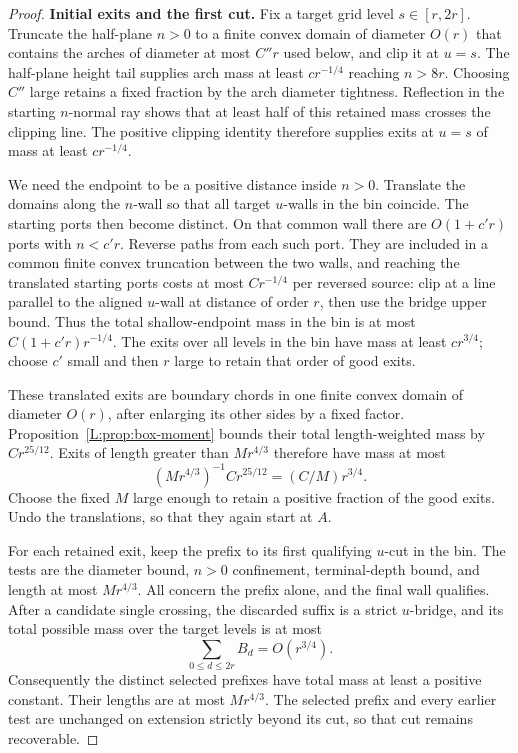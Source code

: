 \documentclass[11pt]{article}
\numberwithin{equation}{section}
\theoremstyle{definition}\newtheorem{definition}[theorem]{Definition}
\theoremstyle{remark}\newtheorem{remark}[theorem]{Remark}
\begin{document}
\begin{proof}
\textbf{Initial exits and the first cut.}
Fix a target grid level \(s\in[r,2r]\). Truncate the half-plane \(n>0\)
to a finite convex domain of diameter \(O(r)\) that contains the arches
of diameter at most \(C''r\) used below, and clip it at \(u=s\).
The half-plane height tail supplies arch mass at least \(cr^{-1/4}\)
reaching \(n>8r\). Choosing \(C''\) large retains a fixed fraction by
the arch diameter tightness. Reflection in the starting \(n\)-normal
ray shows that at least half of this retained mass crosses the clipping
line. The positive clipping identity therefore supplies exits at \(u=s\)
of mass at least \(cr^{-1/4}\).

We need the endpoint to be a positive distance inside \(n>0\).
Translate the domains along the \(n\)-wall so that all target \(u\)-walls
in the bin coincide. The starting ports then become distinct. On that
common wall there are \(O(1+c'r)\) ports with \(n<c'r\). Reverse paths
from each such port. They are included in a common finite convex
truncation between the two walls, and reaching the translated starting
ports costs at most \(Cr^{-1/4}\) per reversed source: clip at a line
parallel to the aligned \(u\)-wall at distance of order \(r\), then use
the bridge upper bound. Thus the total shallow-endpoint mass in the bin
is at most \(C(1+c'r)r^{-1/4}\). The exits over all levels in the bin
have mass at least \(cr^{3/4}\); choose \(c'\) small and then \(r\)
large to retain that order of good exits.

These translated exits are boundary chords in one finite convex domain
of diameter \(O(r)\), after enlarging its other sides by a fixed factor.
Proposition~\ref{L:prop:box-moment} bounds their total length-weighted
mass by \(Cr^{25/12}\). Exits of length greater than \(Mr^{4/3}\)
therefore have mass at most
\[
 (Mr^{4/3})^{-1}Cr^{25/12}=(C/M)r^{3/4}.
\]
Choose the fixed \(M\) large enough to retain a positive fraction of
the good exits. Undo the translations, so that they again start at \(A\).

For each retained exit, keep the prefix to its first qualifying
\(u\)-cut in the bin. The tests are the diameter bound, \(n>0\)
confinement, terminal-depth bound, and length at most \(Mr^{4/3}\).
All concern the prefix alone, and the final wall qualifies. After a
candidate single crossing, the discarded suffix is a strict
\(u\)-bridge, and its total possible mass over the target levels is
at most
\[
 \sum_{0\le d\le2r}B_d=O(r^{3/4}).
\]
Consequently the distinct selected prefixes have total mass at least
a positive constant. Their lengths are at most \(Mr^{4/3}\).
The selected prefix and every earlier test are unchanged on extension
strictly beyond its cut, so that cut remains recoverable.


\end{proof}
\end{document}

